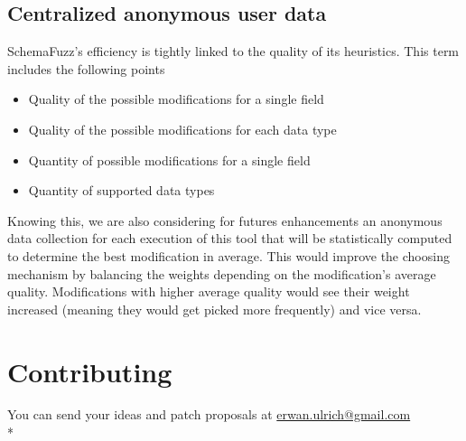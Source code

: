 \documentclass{article}
\begin{document}
\begin{empfile}
		\subsection{Centralized anonymous user data}
SchemaFuzz's efficiency is tightly linked to the quality of its heuristics. This term includes the following points 
		\begin{itemize}
		\item{Quality of the possible modifications for a single field}
		\item{Quality of the possible modifications for each data type}
		\item{Quantity of possible modifications for a single field}
		\item{Quantity of supported data types}
		\end{itemize}
Knowing this, we are also considering for futures enhancements an anonymous data collection  for each execution of this tool that will be statistically computed to determine the best modification in average. This would improve the choosing mechanism by balancing the weights  depending on the modification's average quality. Modifications with higher average quality would see their weight increased (meaning they would get picked more frequently) and vice versa. 			



	\section{Contributing}
You can send your ideas and patch proposals at \url{erwan.ulrich@gmail.com} \\*

\appendix	
\newpage

	
			
			
\end{empfile}
\end{document}
